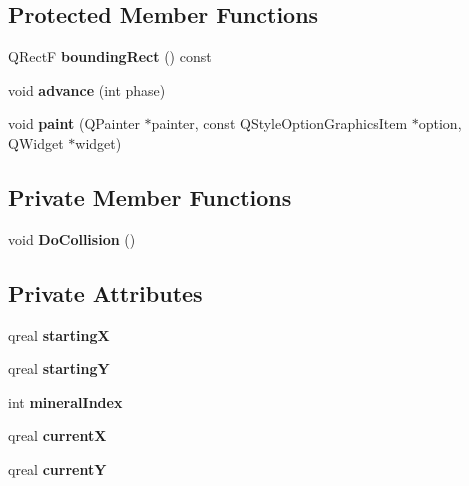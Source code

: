 \subsection*{Protected Member Functions}
\begin{DoxyCompactItemize}
\item 
\hypertarget{classmineral_a4e9685fc56fee4b2006ecda5c3d772ea}{Q\-Rect\-F {\bfseries bounding\-Rect} () const }\label{classmineral_a4e9685fc56fee4b2006ecda5c3d772ea}

\item 
\hypertarget{classmineral_a3f644b75e639e41352a174e4fb172735}{void {\bfseries advance} (int phase)}\label{classmineral_a3f644b75e639e41352a174e4fb172735}

\item 
\hypertarget{classmineral_a3246c441cc664188480f47c7197e65ad}{void {\bfseries paint} (Q\-Painter $\ast$painter, const Q\-Style\-Option\-Graphics\-Item $\ast$option, Q\-Widget $\ast$widget)}\label{classmineral_a3246c441cc664188480f47c7197e65ad}

\end{DoxyCompactItemize}
\subsection*{Private Member Functions}
\begin{DoxyCompactItemize}
\item 
\hypertarget{classmineral_a98ab232d582fed02412e8531efb29541}{void {\bfseries Do\-Collision} ()}\label{classmineral_a98ab232d582fed02412e8531efb29541}

\end{DoxyCompactItemize}
\subsection*{Private Attributes}
\begin{DoxyCompactItemize}
\item 
\hypertarget{classmineral_a7b724d02805b0ac5c7c47f4baeeca536}{qreal {\bfseries starting\-X}}\label{classmineral_a7b724d02805b0ac5c7c47f4baeeca536}

\item 
\hypertarget{classmineral_a8921517404d0773bc5924a2ac081c02c}{qreal {\bfseries starting\-Y}}\label{classmineral_a8921517404d0773bc5924a2ac081c02c}

\item 
\hypertarget{classmineral_aefb2a4a4ba71b691cf1071c828745bcc}{int {\bfseries mineral\-Index}}\label{classmineral_aefb2a4a4ba71b691cf1071c828745bcc}

\item 
\hypertarget{classmineral_a0bbaef46590a33fb889ba5a8f9e5ff34}{qreal {\bfseries current\-X}}\label{classmineral_a0bbaef46590a33fb889ba5a8f9e5ff34}

\item 
\hypertarget{classmineral_a386a752f3b90474a767eca7d2b158218}{qreal {\bfseries current\-Y}}\label{classmineral_a386a752f3b90474a767eca7d2b158218}

\end{DoxyCompactItemize}


